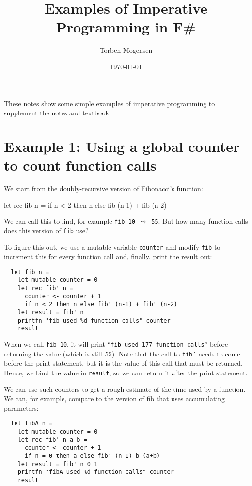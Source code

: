 \documentclass[a4paper]{article}
\begin{document}
\title{Examples of Imperative Programming in F\#}

\author{Torben Mogensen}
\date{\today}

\maketitle

\noindent
These notes show some simple examples of imperative programming to
supplement the notes and textbook.

\section{Example 1: Using a global counter to count function calls}

We start from the doubly-recursive version of Fibonacci's function:

\begin{tabular}
  let rec fib n =
    if n < 2 then n else fib (n-1) + fib (n-2)
\end{tabular}

\noindent
We can call this to find, for example \texttt{fib 10 $\leadsto$ 55}.
But how many function calls does this version of \texttt{fib} use?

To figure this out, we use a mutable variable \texttt{counter} and
modify \texttt{fib} to increment this for every function call and,
finally, print the result out:

\begin{verbatim}
  let fib n =
    let mutable counter = 0
    let rec fib' n =
      counter <- counter + 1
      if n < 2 then n else fib' (n-1) + fib' (n-2)
    let result = fib' n
    printfn "fib used %d function calls" counter
    result
\end{verbatim}

\noindent
When we call \texttt{fib 10}, it will print ``\texttt{fib used 177
  function calls}'' before returning the value (which is still 55).
Note that the call to \texttt{fib'} needs to come before the print
statement, but it is the value of this call that must be returned.
Hence, we bind the value in \texttt{result}, so we can return it after
the print statement.

We can use such counters to get a rough estimate of the time used by a
function.  We can, for example, compare to the version of fib that
uses accumulating parameters:

\begin{verbatim}
  let fibA n =
    let mutable counter = 0
    let rec fib' n a b =
      counter <- counter + 1
      if n = 0 then a else fib' (n-1) b (a+b)
    let result = fib' n 0 1
    printfn "fibA used %d function calls" counter
    result
\end{verbatim}
\end{document}
